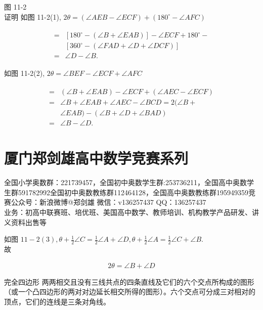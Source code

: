 \documentclass[10pt]{article}
\begin{document}
图 11-2\\
证明 如图 11-2(1), $2 \theta=(\angle A E B-\angle E C F)+\left(180^{\circ}-\angle A F C\right)$

\begin{align*}
\begin{aligned}
= & {\left[180^{\circ}-(\angle B+\angle E A B)\right]-\angle E C F+180^{\circ}-} \\
& {\left[360^{\circ}-(\angle F A D+\angle D+\angle D C F)\right] } \\
= & \angle D-\angle B .
\end{aligned}
\end{align*}

如图 11-2(2), $2 \theta=\angle B E F-\angle E C F+\angle A F C$

\begin{align*}
\begin{aligned}
= & (\angle B+\angle E A B)-\angle E C F+(\angle A E C-\angle E C F) \\
= & \angle B+\angle E A B+\angle A E C-\angle B C D=2(\angle B+ \\
& \angle E A B)-(\angle B+\angle D+\angle B A D) \\
= & \angle B-\angle D .
\end{aligned}
\end{align*}

\section*{厦门郑剑雄高中数学竞赛系列}
全国小学奥数群：221739457，全国初中奥数学生群:253736211，全国高中奥数学生群591782992全国初中奥数教练群112464128，全国高中奥数教练群195949359竞赛公众号：新浪微博@郑剑雄 微信：v136257437 QQ：136257437\\
业务：初高中联赛班、培优班、美国高中数学、教师培训、机构教学产品研发、讲义资料出售等

如图 $11-2(3), \theta+\frac{1}{2} \angle C=\frac{1}{2} \angle A+\angle D, \theta+\frac{1}{2} \angle A=\frac{1}{2} \angle C+\angle B$.\\
故

\begin{align*}
2 \theta=\angle B+\angle D
\end{align*}

完全四边形 两两相交且没有三线共点的四条直线及它们的六个交点所构成的图形（或一个凸四边形的两对对边延长相交所得的图形）。六个交点可分成三对相对的顶点，它们的连线是三条对角线。
\end{document}
